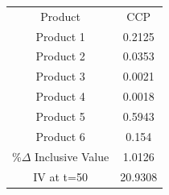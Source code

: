 \begin{tabular}{cc}
Product & CCP \\
Product 1 & 0.2125 \\
Product 2 & 0.0353 \\
Product 3 & 0.0021 \\
Product 4 & 0.0018 \\
Product 5 & 0.5943 \\
Product 6 & 0.154 \\
$\%\Delta$ Inclusive Value & 1.0126 \\
IV at t=50 & 20.9308 \\
\end{tabular}